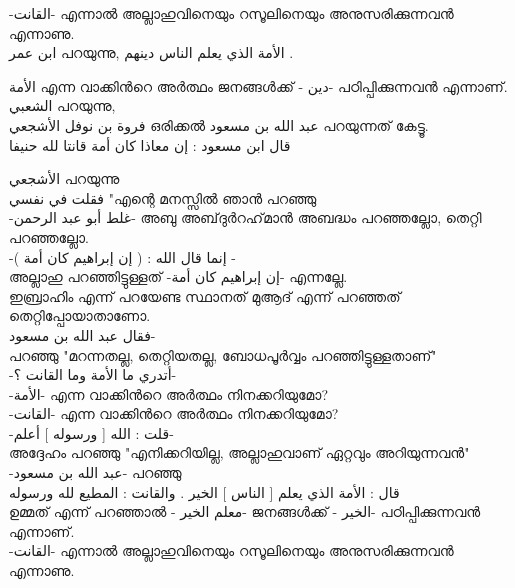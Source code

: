   -\textarabic{القانت}- എന്നാൽ അല്ലാഹുവിനെയും റസൂലിനെയും അനുസരിക്കുന്നവൻ എന്നാണു. \\
 
 
 
 
 \textarabic{ ابن عمر} പറയുന്നു, \textarabic{الأمة الذي يعلم الناس دينهم .}
 
   \textarabic{الأمة} എന്ന വാക്കിൻറെ അർത്ഥം ജനങ്ങൾക്ക് -\textarabic{ دين}- പഠിപ്പിക്കുന്നവൻ എന്നാണ്. \\
 
 
 
 \textarabic{الشعبي} പറയുന്നു, \\
 \textarabic{فروة بن نوفل الأشجعي}  ഒരിക്കൽ \textarabic{عبد الله بن مسعود} പറയുന്നത് കേട്ടൂ. \\ 
 \textarabic{ قال ابن مسعود : إن معاذا كان أمة قانتا لله حنيفا}
 
 \textarabic{الأشجعي} പറയുന്നു \\
 \textarabic{ فقلت في نفسي} "എന്റെ മനസ്സിൽ ഞാൻ പറഞ്ഞു \\ -\textarabic{غلط أبو عبد الرحمن}- അബു അബ്‌ദുർറഹ്‌മാൻ അബദ്ധം പറഞ്ഞല്ലോ, തെറ്റി പറഞ്ഞല്ലോ. \\-\textarabic{إنما قال الله : ( إن إبراهيم كان أمة ) }- \\
 അല്ലാഹു പറഞ്ഞിട്ടുള്ളത് -\textarabic{إن إبراهيم كان أمة}-  എന്നല്ലേ. \\
 ഇബ്രാഹിം എന്ന് പറയേണ്ട സ്ഥാനത് മുആദ് എന്ന് പറഞ്ഞത് തെറ്റിപ്പോയാതാണോ.  \\
 \textarabic{فقال عبد الله بن مسعود}- \\
 പറഞ്ഞു 
 "മറന്നതല്ല, തെറ്റിയതല്ല, ബോധപൂർവ്വം പറഞ്ഞിട്ടുള്ളതാണ്" \\
 -\textarabic{أتدري ما الأمة وما القانت ؟}- \\
 -\textarabic{الأمة}- എന്ന വാക്കിൻറെ അർത്ഥം നിനക്കറിയുമോ? \\
 -\textarabic{القانت}- എന്ന വാക്കിൻറെ അർത്ഥം നിനക്കറിയുമോ? \\
 
 -\textarabic{قلت : الله [ ورسوله ] أعلم}- \\
 അദ്ദേഹം പറഞ്ഞു "എനിക്കറിയില്ല, അല്ലാഹുവാണ് ഏറ്റവും അറിയുന്നവൻ" \\
 
 -\textarabic{عبد الله بن مسعود}- പറഞ്ഞു \\
 \textarabic{ قال : الأمة الذي يعلم [ الناس ] الخير . والقانت : المطيع لله ورسوله} \\
   ഉമ്മത് എന്ന് പറഞ്ഞാൽ -\textarabic{ معلم الخير}- 
 ജനങ്ങൾക്ക് -\textarabic{ الخير}- പഠിപ്പിക്കുന്നവൻ എന്നാണ്. \\
 -\textarabic{القانت}- എന്നാൽ അല്ലാഹുവിനെയും റസൂലിനെയും അനുസരിക്കുന്നവൻ എന്നാണു. \\
 
